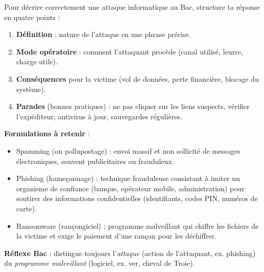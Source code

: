 \documentclass[11pt]{article}
\newcommand{\cle}[1]{{\popxbold\color{popdark}#1}}
\begin{document}
\begin{methode}
Pour décrire correctement une attaque informatique au Bac, structure ta réponse en quatre points :
\begin{enumerate}
  \item \textbf{Définition} : nature de l'attaque en une phrase précise.
  \item \textbf{Mode opératoire} : comment l'attaquant procède (canal utilisé, leurre, charge utile).
  \item \textbf{Conséquences} pour la victime (vol de données, perte financière, blocage du système).
  \item \textbf{Parades} (bonnes pratiques) : ne pas cliquer sur les liens suspects, vérifier l'expéditeur, antivirus à jour, sauvegardes régulières.
\end{enumerate}
\textbf{Formulations à retenir} :
\begin{itemize}
  \item \cle{Spamming} (ou pollupostage) : envoi massif et non sollicité de messages électroniques, souvent publicitaires ou frauduleux.
  \item \cle{Phishing} (hameçonnage) : technique frauduleuse consistant à imiter un organisme de confiance (banque, opérateur mobile, administration) pour soutirer des informations confidentielles (identifiants, codes PIN, numéros de carte).
  \item \cle{Ransomware} (rançongiciel) : programme malveillant qui chiffre les fichiers de la victime et exige le paiement d'une rançon pour les déchiffrer.
\end{itemize}
\textbf{Réflexe Bac} : distingue toujours l'\emph{attaque} (action de l'attaquant, ex. phishing) du \emph{programme malveillant} (logiciel, ex. ver, cheval de Troie).
\end{methode}
\end{document}
